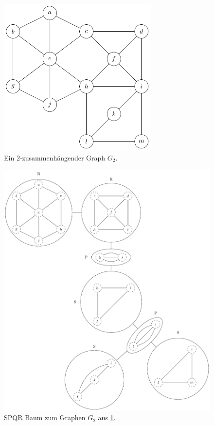 \begin{figure}[H]
  \centering
  \includegraphics[width=8cm]{bilder/2-Block-Tree1.pdf}
  \caption{Ein $2$-zusammenhängender Graph $G_2$.}
  \label{fig:2-Block-Tree1}
\end{figure}

\begin{figure}[H]
  \centering
  \includegraphics[width=\textwidth,height=\textheight,keepaspectratio]{bilder/SPQR-Tree.pdf}
  \caption{SPQR Baum zum Graphen $G_2$ aus \Abb \ref{fig:2-Block-Tree1}.}
  \label{fig:SPQR-Tree}
\end{figure}

